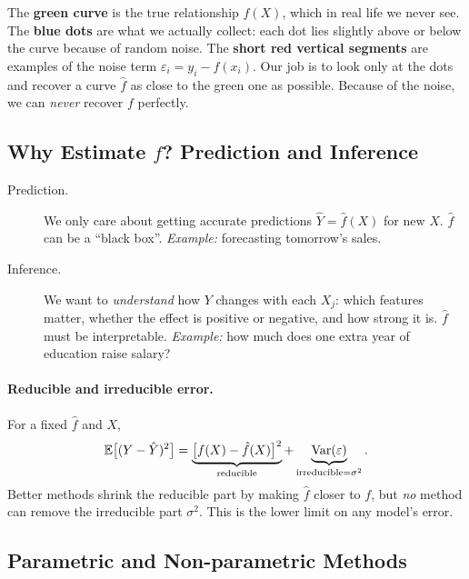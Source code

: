 \begin{explain}
The \textbf{green curve} is the true relationship $f(X)$, which in real life we never see. The \textbf{blue dots} are what we actually collect: each dot lies slightly above or below the curve because of random noise. The \textbf{short red vertical segments} are examples of the noise term $\varepsilon_i = y_i - f(x_i)$. Our job is to look only at the dots and recover a curve $\hat f$ as close to the green one as possible. Because of the noise, we can \emph{never} recover $f$ perfectly.
\end{explain}

\subsection{Why Estimate $f$? Prediction and Inference}

\begin{description}
  \item[Prediction.] We only care about getting accurate predictions $\hat Y=\hat f(X)$ for new $X$. $\hat f$ can be a ``black box''. \emph{Example:} forecasting tomorrow's sales.
  \item[Inference.] We want to \emph{understand} how $Y$ changes with each $X_j$: which features matter, whether the effect is positive or negative, and how strong it is. $\hat f$ must be interpretable. \emph{Example:} how much does one extra year of education raise salary?
\end{description}

\paragraph{Reducible and irreducible error.} For a fixed $\hat f$ and $X$,
\begin{equation}\label{eq:red}
  \mathbb{E}\big[(Y-\hat Y)^2\big] = \underbrace{\big[f(X)-\hat f(X)\big]^2}_{\text{reducible}} + \underbrace{\operatorname{Var}(\varepsilon)}_{\text{irreducible}= \sigma^2}.
\end{equation}
Better methods shrink the reducible part by making $\hat f$ closer to $f$, but \emph{no} method can remove the irreducible part $\sigma^2$. This is the lower limit on any model's error.

\subsection{Parametric and Non-parametric Methods}

